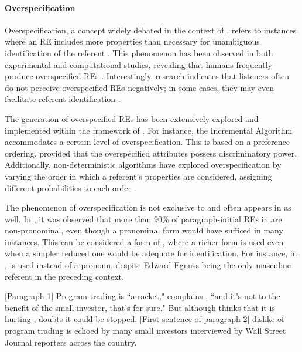 \paragraph*{Overspecification}

Overspecification, a concept widely debated in the context of \shot, refers to instances where an RE includes more properties than necessary for unambiguous identification of the referent \citep{van2016computational}. This phenomenon has been observed in both experimental and computational studies, revealing that humans frequently produce overspecified REs \citep{pechmann1989incremental, ENGELHARDT2006, Koolen2011, Paraboni2017,Degen2020}. Interestingly, research indicates that listeners often do not perceive overspecified REs negatively; in some cases, they may even facilitate referent identification \citep{ENGELHARDT2006, Arts2011}.

The generation of overspecified REs has been extensively explored and implemented within the framework of \shot. For instance, the Incremental Algorithm \citep{dale1995computational} accommodates a certain level of overspecification. This is based on a preference ordering, provided that the overspecified attributes possess discriminatory power. Additionally, non-deterministic algorithms have explored overspecification by varying the order in which a referent’s properties are considered, assigning different probabilities to each order \citep{van2012toward,van2016computational,Gompel2019}.

The phenomenon of overspecification is not exclusive to \shot and often appears in \context as well. In , it was observed that more than 90\% of paragraph-initial REs in \context are non-pronominal, even though a pronominal form would have sufficed in many instances. This can be considered a form of , where a richer form is used even when a simpler reduced one would be adequate for identification. For instance, in ,  is used instead of a pronoun, despite Edward Egnuss being the only masculine referent in the preceding context.


\begin{exe}
	\ex {} \label{ex:edwardegnuss}
	\begin{xlist}
		\ex \label{ex:edwardegnuss1} $[$Paragraph 1$]$ Program trading is ``a racket," complains , ``and it's not to the benefit of the small investor, that's for sure." But although  thinks that it is hurting ,  doubts it could be stopped.
		\ex \label{ex:edwardegnuss2} $[$First sentence of paragraph 2$]$  dislike of program trading is echoed by many small investors interviewed by Wall Street Journal reporters across the country.
	\end{xlist}
\end{exe}


